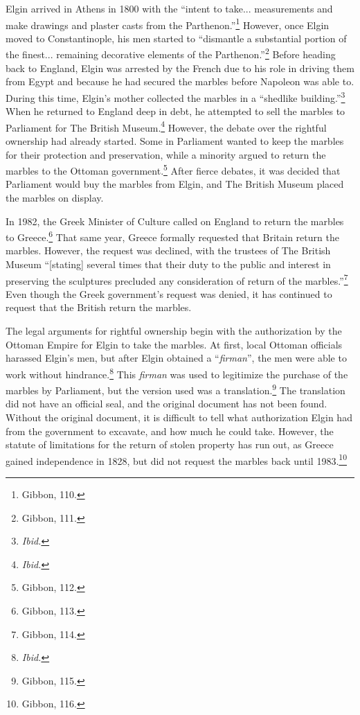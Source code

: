 \documentclass[11pt]{article}
\begin{document}
Elgin arrived in Athens in 1800 with the ``intent to take... measurements and make drawings and plaster casts from the Parthenon.''\footnote{Gibbon, 110.} However, once Elgin moved to Constantinople, his men started to ``dismantle a substantial portion of the finest... remaining decorative elements of the Parthenon.''\footnote{Gibbon, 111.} Before heading back to England, Elgin was arrested by the French due to his role in driving them from Egypt and because he had secured the marbles before Napoleon was able to. During this time, Elgin's mother collected the marbles in a ``shedlike building.''\footnote{\textit{Ibid.}} When he returned to England deep in debt, he attempted to sell the marbles to Parliament for The British Museum.\footnote{\textit{Ibid.}} However, the debate over the rightful ownership had already started. Some in Parliament wanted to keep the marbles for their protection and preservation, while a minority argued to return the marbles to the Ottoman government.\footnote{Gibbon, 112.} After fierce debates, it was decided that Parliament would buy the marbles from Elgin, and The British Museum placed the marbles on display.

In 1982, the Greek Minister of Culture called on England to return the marbles to Greece.\footnote{Gibbon, 113.} That same year, Greece formally requested that Britain return the marbles. However, the request was declined, with the trustees of The British Museum ``[stating] several times that their duty to the public and interest in preserving the sculptures precluded any consideration of return of the marbles.''\footnote{Gibbon, 114.} Even though the Greek government's request was denied, it has continued to request that the British return the marbles.

The legal arguments for rightful ownership begin with the authorization by the Ottoman Empire for Elgin to take the marbles. At first, local Ottoman officials harassed Elgin's men, but after Elgin obtained a ``\textit{firman}'', the men were able to work without hindrance.\footnote{\textit{Ibid.}} This \textit{firman} was used to legitimize the purchase of the marbles by Parliament, but the version used was a translation.\footnote{Gibbon, 115.} The translation did not have an official seal, and the original document has not been found. Without the original document, it is difficult to tell what authorization Elgin had from the government to excavate, and how much he could take. However, the statute of limitations for the return of stolen property has run out, as Greece gained independence in 1828, but did not request the marbles back until 1983.\footnote{Gibbon, 116.}
\end{document}
